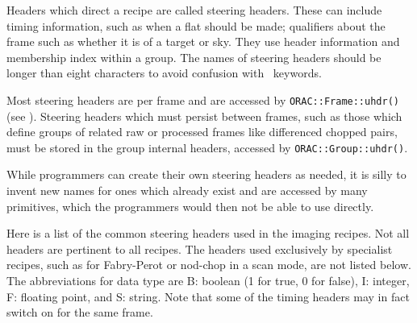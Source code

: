 \documentclass[twoside,11pt,nolof]{starlink}
\providecommand{\FITSref}{\htmladdnormallink{FITS}{http://fits.gsfc.nasa.gov/}}
\begin{document}
Headers which direct a recipe are called steering headers.  These can
include timing information, such as when a flat should be made;
qualifiers about the frame such as whether it is of a target or sky.
They use header information and membership index within a group.
The names of steering headers should be longer than eight characters
to avoid confusion with \FITSref\ keywords.

Most steering headers are per frame and are accessed by \texttt{ORAC::Frame::uhdr()} (see ).
Steering headers which must persist between frames, such as those
which define groups of related raw or processed frames like
differenced chopped pairs, must be stored in the group internal
headers, accessed by \texttt{ORAC::Group::uhdr()}.

While programmers can create their own steering headers as needed, it
is silly to invent new names for ones which already exist and are
accessed by many primitives, which the programmers would then not be
able to use directly.

Here is a list of the common steering headers used in the imaging
recipes.  Not all headers are pertinent to all recipes.  The headers
used exclusively by specialist recipes, such as for Fabry-Perot or
nod-chop in a scan mode, are not listed below.  The abbreviations for
data type are B: boolean (1 for true, 0 for false), I: integer, F:
floating point, and S: string.  Note that some of the timing headers
may in fact switch on for the same frame.
\end{document}
